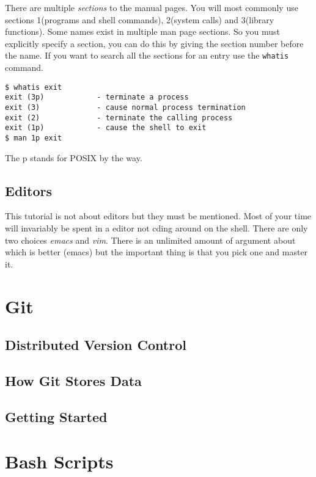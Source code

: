\documentclass[10pt]{article}
\begin{document}
  There are multiple \textit{sections} to the manual pages. You will most commonly use sections 1(programs and shell commands), 2(system calls) and 3(library functions). Some names exist in multiple
  man page sections. So you must explicitly specify a section, you can do this by giving the section number before the name. If you want to search all the sections for an entry use the \texttt{whatis} command.

\begin{verbatim}
$ whatis exit
exit (3p)            - terminate a process
exit (3)             - cause normal process termination
exit (2)             - terminate the calling process
exit (1p)            - cause the shell to exit
$ man 1p exit
\end{verbatim}

  The p stands for POSIX by the way.



  
  \subsection{Editors}
  This tutorial is not about editors but they must be mentioned. Most of your time will invariably be spent in a editor not cding around on the shell. There are only two choices \textit{emacs} and \textit{vim}. There is an unlimited amount of argument about which is better (emacs) but the important thing is that you pick one and master it.
  
\section{Git}

  \subsection{Distributed Version Control}
  \subsection{How Git Stores Data}
  \subsection{Getting Started}
  
\section{Bash Scripts}





\end{document}
